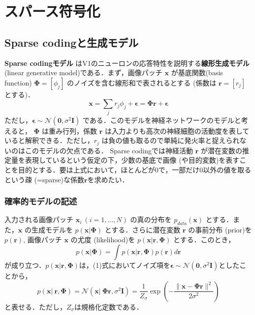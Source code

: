 \section{スパース符号化}
\subsection{Sparse codingと生成モデル}
\textbf{Sparse codingモデル} \citep{Olshausen1996-xe} \citep{Olshausen1997-qu}はV1のニューロンの応答特性を説明する\textbf{線形生成モデル} (linear generative model)である．まず，画像パッチ $\mathbf{x}$ が基底関数(basis function) $\mathbf{\Phi} = [\phi_j]$ のノイズを含む線形和で表されるとする (係数は $\mathbf{r}=[r_j]$ とする)．
\begin{equation}
\mathbf{x} = \sum_j r_j \phi_j +\boldsymbol{\epsilon}= \mathbf{\Phi} \mathbf{r}+ \boldsymbol{\epsilon}
\end{equation}
ただし，$\boldsymbol{\epsilon} \sim \mathcal{N}(\mathbf{0}, \sigma^2 \mathbf{I})$ である．このモデルを神経ネットワークのモデルと考えると， $\mathbf{\Phi}$ は重み行列，係数 $\mathbf{r}$ は入力よりも高次の神経細胞の活動度を表していると解釈できる．ただし，$r_j$ は負の値も取るので単純に発火率と捉えられないのはこのモデルの欠点である．
Sparse codingでは神経活動 $\mathbf{r}$ が潜在変数の推定量を表現しているという仮定の下，少数の基底で画像 (や目的変数)を表すことを目的とする．要は上式において，ほとんどが0で，一部だけ0以外の値を取るという疎 (=sparse)な係数$\mathbf{r}$を求めたい．
\subsubsection{確率的モデルの記述}
入力される画像パッチ $\mathbf{x}_i\ (i=1, \ldots, N)$ の真の分布を $p_{data}(\mathbf{x})$ とする．また，$\mathbf{x}$ の生成モデルを $p(\mathbf{x}|\mathbf{\Phi})$ とする．さらに潜在変数 $\mathbf{r}$ の事前分布 (prior)を $p(\mathbf{r})$, 画像パッチ $\mathbf{x}$ の尤度 (likelihood)を $p(\mathbf{x}|\mathbf{r}, \mathbf{\Phi})$ とする．このとき，
\begin{equation}
p(\mathbf{x}|\mathbf{\Phi})=\int p(\mathbf{x}|\mathbf{r}, \mathbf{\Phi})p(\mathbf{r})d\mathbf{r}
\end{equation}
が成り立つ．$p(\mathbf{x}|\mathbf{r}, \mathbf{\Phi})$は，(1)式においてノイズ項を$\boldsymbol{\epsilon} \sim\mathcal{N}(\mathbf{0}, \sigma^2 \mathbf{I})$としたことから，
\begin{equation}
p(\mathbf{x}|\ \mathbf{r}, \mathbf{\Phi})=\mathcal{N}\left(\mathbf{x}|\ \mathbf{\Phi} \mathbf{r}, \sigma^2 \mathbf{I} \right)=\frac{1}{Z_{\sigma}} \exp\left(-\frac{\|\mathbf{x} - \mathbf{\Phi} \mathbf{r}\|^2}{2\sigma^2}\right)
\end{equation}
と表せる．ただし，$Z_{\sigma}$は規格化定数である．
